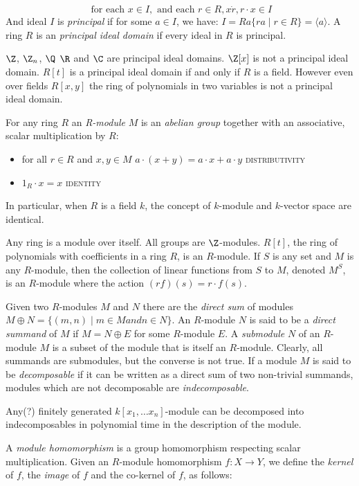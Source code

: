 \[ \textrm{ for each } x \in I, \textrm{ and each } r \in R, x \dot r, r \cdot x \in I  \]
And ideal $I$ is \emph{principal} if for some $a \in I$, we have: $I = Ra \{ ra \mid r \in R\} = \langle a \rangle$.
A ring $R$ is an \emph{principal ideal domain} if every ideal in $R$ is principal.
\begin{example}
$\Z$, $\Z_n$, $\Q$ $\R$ and $\C$ are principal ideal domains. $\Z[x]$ is not a principal ideal domain. $R[t]$ is a principal ideal domain if and only if $R$ is a field. However
even over fields $R[x,y]$ the ring of polynomials in two variables is not a principal ideal domain.
\end{example}
For any ring $R$ an \emph{R-module} $M$ is an \emph{abelian group} together with an associative, scalar multiplication by $R$: 
\begin{itemize}
\item for all $r \in R$ and $x,y \in M$ $a \cdot (x + y)  = a \cdot x + a \cdot y$ \textsc{distributivity}
\item $1_R \cdot x = x$ \textsc{identity}
\end{itemize}
In particular, when $R$ is a field $k$, the concept of $k$-module and $k$-vector space are identical.
\begin{example}
Any ring is a module over itself.  All groups are $\Z$-modules. $R[t]$, the ring of polynomials with coefficients in a ring $R$, is an $R$-module. If $S$ is any set and $M$ is any $R$-module, then the collection of linear functions from $S$ to $M$, denoted $M^S$, is an $R$-module where the action $(rf)(s) =  r \cdot f(s)$.
\end{example}
Given two $R$-modules $M$ and $N$ there are the \emph{direct sum} of modules $M \oplus N = \{ (m,n) \mid m \in M and n \in N \}$.
An $R$-module $N$ is said to be a \emph{direct summand} of $M$ if $M = N \oplus E$ for some $R$-module $E$. 
A \emph{submodule} $N$ of an $R$-module $M$ is a subset of the module that is itself an $R$-module. Clearly, all summands are submodules, but the converse is not true.
If a module $M$ is said to be \emph{decomposable} if it can be written as a direct sum of two non-trivial summands, modules which are not decomposable are \emph{indecomposable}. 
\begin{theorem}
Any(?) finitely generated $k[x_1, \ldots x_n]$-module can be decomposed into indecomposables in polynomial time in the description of the module. 
\end{theorem}
A \emph{module homomorphism} is a group homomorphism respecting scalar multiplication. Given an $R$-module homomorphism $f: X \rightarrow Y $, we define the \emph{kernel} of $f$, the \emph{image} of $f$ and the co-kernel of $f$, as follows: 
